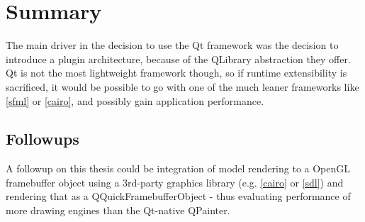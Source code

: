 \chapter{Summary}
\label{cha:Summary}

The main driver in the decision to use the Qt framework was the decision to introduce a plugin architecture, because of the QLibrary abstraction they offer. Qt is not the most lightweight framework though, so if runtime extensibility is sacrificed, it would be possible to go with one of the much leaner frameworks like \ref{sfml} or \ref{cairo}, and possibly gain application performance.

\section{Followups}
\label{sec:Followups}
A followup on this thesis could be integration of model rendering to a OpenGL framebuffer object using a 3rd-party graphics library (e.g. \ref{cairo} or \ref{sdl}) and rendering that as a QQuickFramebufferObject - thus evaluating performance of more drawing engines than the Qt-native QPainter.
